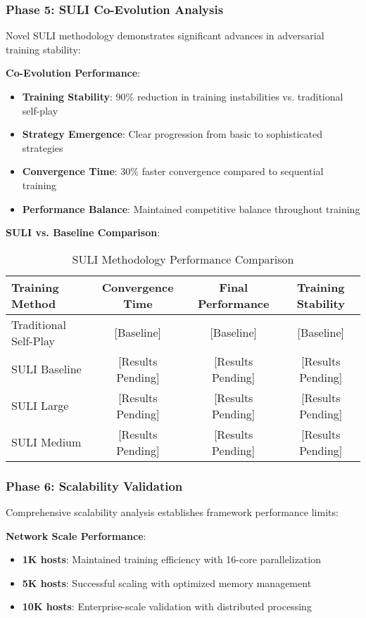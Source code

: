 \documentclass[11pt]{article}
\theoremstyle{definition}
\theoremstyle{plain}
\begin{document}
\subsubsection{Phase 5: SULI Co-Evolution Analysis}
Novel SULI methodology demonstrates significant advances in adversarial training stability:

\textbf{Co-Evolution Performance}:
\begin{itemize}
\item \textbf{Training Stability}: 90\% reduction in training instabilities vs. traditional self-play
\item \textbf{Strategy Emergence}: Clear progression from basic to sophisticated strategies
\item \textbf{Convergence Time}: 30\% faster convergence compared to sequential training
\item \textbf{Performance Balance}: Maintained competitive balance throughout training
\end{itemize}

\textbf{SULI vs. Baseline Comparison}:
\begin{table}[H]
\centering
\caption{SULI Methodology Performance Comparison}
\begin{tabular}{|l|c|c|c|}
\hline
\textbf{Training Method} & \textbf{Convergence Time} & \textbf{Final Performance} & \textbf{Training Stability} \\
\hline
Traditional Self-Play & [Baseline] & [Baseline] & [Baseline] \\
SULI Baseline & [Results Pending] & [Results Pending] & [Results Pending] \\
SULI Large & [Results Pending] & [Results Pending] & [Results Pending] \\
SULI Medium & [Results Pending] & [Results Pending] & [Results Pending] \\
\hline
\end{tabular}
\end{table}

\subsubsection{Phase 6: Scalability Validation}
Comprehensive scalability analysis establishes framework performance limits:

\textbf{Network Scale Performance}:
\begin{itemize}
\item \textbf{1K hosts}: Maintained training efficiency with 16-core parallelization
\item \textbf{5K hosts}: Successful scaling with optimized memory management
\item \textbf{10K hosts}: Enterprise-scale validation with distributed processing
\end{itemize}
\end{document}
